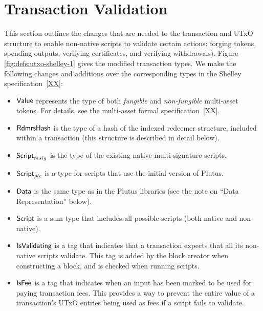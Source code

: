 \section{Transaction Validation}
\label{sec:transactions}

This section outlines the changes that are needed to the transaction and
UTxO structure to enable non-native scripts to validate
certain actions: forging tokens, spending outputs, verifying certificates, and
verifying withdrawals).
%
Figure \ref{fig:defs:utxo-shelley-1} gives the modified transaction types.
We make the following changes and additions over the corresponding types in the
Shelley specification~\ref{XX}:

\begin{itemize}
  \item $\mathsf{Value}$ represents the type of
  both \emph{fungible} and \emph{non-fungible} multi-asset tokens. For details, see the multi-asset formal specification~\ref{XX}.

  \item $\mathsf{RdmrsHash}$ is the type of a hash of the indexed redeemer structure,
  included within a transaction (this structure is described in detail below).

  \item $\mathsf{Script}_{msig}$ is the type of the existing native multi-signature scripts.

  \item $\mathsf{Script}_{plc}$ is a type for scripts that use the initial version of Plutus.

  \item $\mathsf{Data}$ is the same type as in the Plutus libraries (see the note on ``Data Representation'' below).

  \item $\mathsf{Script}$ is a sum type that includes all possible scripts (both native and non-native).

  \item $\mathsf{IsValidating}$ is a tag that indicates that a transaction
  expects that all its non-native scripts validate.
  This tag is added by the block creator when
  constructing a block, and is checked when running scripts.

  \item $\mathsf{IsFee}$ is a tag that indicates when an input has been marked
    to be used for paying transaction fees.
    This provides a way to prevent
  the entire value of a transaction's UTxO entries being used as fees if a script fails to validate.


\end{itemize}
